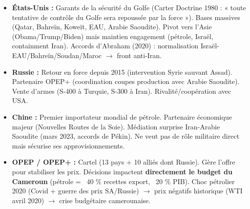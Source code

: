 \documentclass[11pt]{article}
\begin{document}
\begin{itemize}
    \item \textbf{États-Unis :} Garants de la sécurité du Golfe (Carter Doctrine 1980 : « toute tentative de contrôle du Golfe sera repoussée par la force »). Bases massives (Qatar, Bahreïn, Koweït, EAU, Arabie Saoudite). Pivot vers l'Asie (Obama/Trump/Biden) mais maintien engagement (pétrole, Israël, containment Iran). Accords d'Abraham (2020) : normalisation Israël-EAU/Bahreïn/Soudan/Maroc $\rightarrow$ front anti-Iran.
    \item \textbf{Russie :} Retour en force depuis 2015 (intervention Syrie sauvant Assad). Partenaire OPEP+ (coordination coupes production avec Arabie Saoudite). Vente d'armes (S-400 à Turquie, S-300 à Iran). Rivalité/coopération avec USA.
    \item \textbf{Chine :} Premier importateur mondial de pétrole. Partenaire économique majeur (Nouvelles Routes de la Soie). Médiation surprise Iran-Arabie Saoudite (mars 2023, accords de Pékin). Ne veut pas de rôle militaire direct mais sécurise ses approvisionnements.
    \item \textbf{OPEP / OPEP+ :} Cartel (13 pays + 10 alliés dont Russie). Gère l'offre pour stabiliser les prix. Décisions impactent \textbf{directement le budget du Cameroun} (pétrole = ~40 \% recettes export, ~20 \% PIB). Choc pétrolier 2020 (Covid + guerre des prix SA/Russie) $\rightarrow$ prix négatifs historique (WTI avril 2020) $\rightarrow$ crise budgétaire camerounaise.
\end{itemize}
\end{document}
